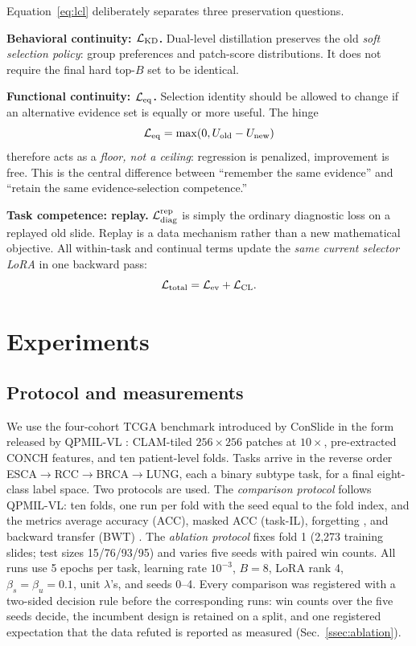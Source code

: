 \documentclass{article}
\def\L{{\cal L}}
\begin{document}
Equation~\ref{eq:lcl} deliberately separates three preservation questions.

\textbf{Behavioral continuity: $\L_{\rm KD}$.}
Dual-level distillation preserves the old \emph{soft selection policy}: group preferences and patch-score distributions.
It does not require the final hard top-$B$ set to be identical.

\textbf{Functional continuity: $\L_{\rm eq}$.}
Selection identity should be allowed to change if an alternative evidence set is equally or more useful.
The hinge
\[
\L_{\rm eq}=\max(0,U_{\rm old}-U_{\rm new})
\]
therefore acts as a \emph{floor, not a ceiling}: regression is penalized, improvement is free.
This is the central difference between ``remember the same evidence'' and ``retain the same evidence-selection competence.''

\textbf{Task competence: replay.}
$\L_{\mathrm{diag}}^{\mathrm{rep}}$ is simply the ordinary diagnostic loss on a replayed old slide.
Replay is a data mechanism rather than a new mathematical objective.
All within-task and continual terms update the \emph{same current selector LoRA} in one backward pass:
\[
\L_{\mathrm{total}}=\L_{\mathrm{ev}}+\L_{\mathrm{CL}}.
\]

\section{Experiments}
\label{sec:exp}

\subsection{Protocol and measurements}

We use the four-cohort TCGA benchmark introduced by ConSlide \cite{huang2023conslide} in the form released by QPMIL-VL \cite{gou2025qpmil}: CLAM-tiled $256\times256$ patches at $10\times$, pre-extracted CONCH features, and ten patient-level folds. Tasks arrive in the reverse order ESCA$\rightarrow$RCC$\rightarrow$BRCA$\rightarrow$LUNG, each a binary subtype task, for a final eight-class label space. Two protocols are used. The \emph{comparison protocol} follows QPMIL-VL: ten folds, one run per fold with the seed equal to the fold index, and the metrics average accuracy (ACC), masked ACC (task-IL), forgetting \cite{chaudhry2018rwalk}, and backward transfer (BWT) \cite{lopezpaz2017gem}. The \emph{ablation protocol} fixes fold 1 (2,273 training slides; test sizes 15/76/93/95) and varies five seeds with paired win counts.
All runs use 5 epochs per task, learning rate $10^{-3}$, $B=8$, LoRA rank 4, $\beta_s{=}\beta_u{=}0.1$, unit $\lambda$'s, and seeds 0--4. Every comparison was registered with a two-sided decision rule before the corresponding runs: win counts over the five seeds decide, the incumbent design is retained on a split, and one registered expectation that the data refuted is reported as measured (Sec.~\ref{ssec:ablation}).
\end{document}
